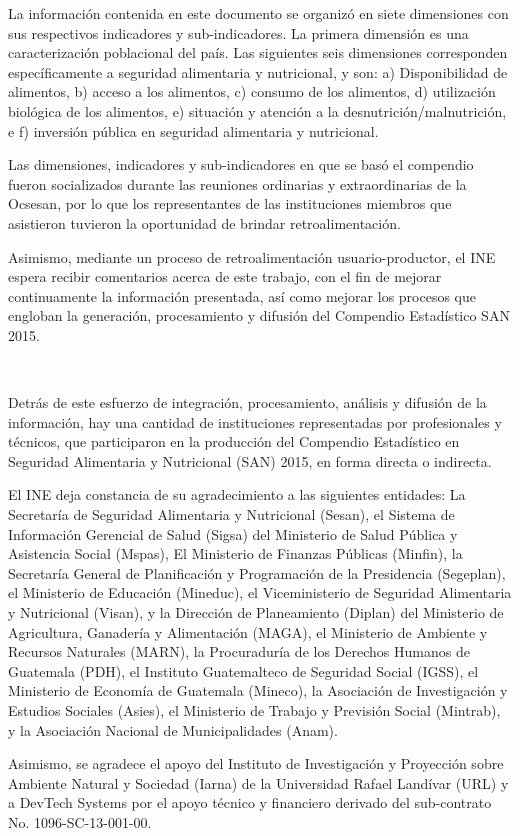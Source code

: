 La información contenida en este documento se organizó en siete dimensiones con sus respectivos indicadores y sub-indicadores. La primera dimensión es una caracterización poblacional del país. Las siguientes seis dimensiones corresponden específicamente a seguridad alimentaria y nutricional, y son: a) Disponibilidad de alimentos, b) acceso a los alimentos, c) consumo de los alimentos, d) utilización biológica de los alimentos, e) situación y atención a la desnutrición/malnutrición, e f) inversión pública en seguridad alimentaria y nutricional. 

Las dimensiones, indicadores y sub-indicadores en que se basó el compendio fueron socializados durante las reuniones ordinarias y extraordinarias de la Ocsesan, por lo que los representantes de las instituciones miembros que asistieron tuvieron la oportunidad de brindar retroalimentación.

Asimismo, mediante un proceso de retroalimentación usuario-productor, el INE espera recibir comentarios acerca de este trabajo, con el fin de mejorar continuamente la información presentada, así como mejorar los procesos que engloban la generación, procesamiento y difusión del Compendio Estadístico SAN 2015.


$\ $

\cleardoublepage



\indent{}
\\


Detrás de este esfuerzo de integración, procesamiento, análisis y difusión de la información, hay una cantidad de instituciones representadas por profesionales y técnicos, que participaron en la producción del Compendio Estadístico en Seguridad Alimentaria y Nutricional (SAN) 2015, en forma directa o indirecta.

El INE deja constancia de su agradecimiento a las siguientes entidades: La Secretaría de Seguridad Alimentaria y Nutricional (Sesan), el Sistema de Información Gerencial de Salud (Sigsa) del Ministerio de Salud Pública y Asistencia Social (Mspas), El Ministerio de Finanzas Públicas (Minfin), la Secretaría General de Planificación y Programación de la Presidencia (Segeplan), el Ministerio de Educación (Mineduc), el Viceministerio de Seguridad Alimentaria y Nutricional (Visan), y la Dirección de Planeamiento (Diplan) del Ministerio de Agricultura, Ganadería y Alimentación (MAGA), el Ministerio de Ambiente y Recursos Naturales (MARN), la Procuraduría de los Derechos Humanos de Guatemala (PDH), el Instituto Guatemalteco de Seguridad Social (IGSS), el Ministerio de Economía de Guatemala (Mineco), la Asociación de Investigación y Estudios Sociales (Asies), el Ministerio de Trabajo y Previsión Social (Mintrab), y la Asociación Nacional de Municipalidades (Anam).

Asimismo, se agradece el apoyo del Instituto de Investigación y Proyección sobre Ambiente Natural y Sociedad (Iarna) de la Universidad Rafael Landívar (URL) y a DevTech Systems por el apoyo técnico y financiero derivado del sub-contrato No. 1096-SC-13-001-00.\\[16mm]



